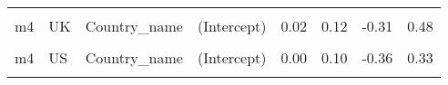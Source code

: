 \begin{table}
\begin{tabular}[t]{llllrrrr}
\cellcolor{gray!10}{m4} & \cellcolor{gray!10}{SE} & \cellcolor{gray!10}{Country\_name} & \cellcolor{gray!10}{EPS} & \cellcolor{gray!10}{-0.13} & \cellcolor{gray!10}{0.07} & \cellcolor{gray!10}{-0.29} & \cellcolor{gray!10}{0.03}\\
m4 & UK & Country\_name & (Intercept) & 0.02 & 0.12 & -0.31 & 0.48\\
\cellcolor{gray!10}{m4} & \cellcolor{gray!10}{UK} & \cellcolor{gray!10}{Country\_name} & \cellcolor{gray!10}{EPS} & \cellcolor{gray!10}{0.05} & \cellcolor{gray!10}{0.06} & \cellcolor{gray!10}{-0.09} & \cellcolor{gray!10}{0.19}\\
m4 & US & Country\_name & (Intercept) & 0.00 & 0.10 & -0.36 & 0.33\\
\cellcolor{gray!10}{m4} & \cellcolor{gray!10}{US} & \cellcolor{gray!10}{Country\_name} & \cellcolor{gray!10}{EPS} & \cellcolor{gray!10}{-0.01} & \cellcolor{gray!10}{0.06} & \cellcolor{gray!10}{-0.16} & \cellcolor{gray!10}{0.13}\\
\bottomrule
\end{tabular}
\end{table}
